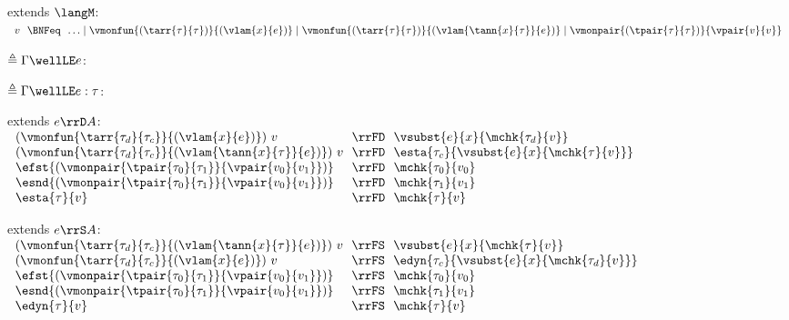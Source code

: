 \begin{flushleft}

 extends $\langM$:\\
$\begin{array}{l@{~~}c@{~~}l}
  v & \BNFeq & \ldots \mid \vmonfun{(\tarr{\tau}{\tau})}{(\vlam{x}{e})} \mid
      \vmonfun{(\tarr{\tau}{\tau})}{(\vlam{\tann{x}{\tau}}{e})} \mid
      \vmonpair{(\tpair{\tau}{\tau})}{\vpair{v}{v}}
\end{array}$

\bigskip
\begin{minipage}[t]{\columnwidth}
 $\triangleq \Gamma \wellLE e$:
\end{minipage}\hspace{\columnsep}%
\begin{minipage}[t]{\columnwidth}
 $\triangleq \Gamma \wellLE e : \tau$:
\end{minipage}


\medskip
\begin{minipage}[t]{\columnwidth}
 extends $e \rrD A$:\\
$\begin{array}{l@{~~}c@{~~}l}
  (\vmonfun{\tarr{\tau_d}{\tau_c}}{(\vlam{x}{e})})~v & \rrFD & \vsubst{e}{x}{\mchk{\tau_d}{v}}
\\
  (\vmonfun{\tarr{\tau_d}{\tau_c}}{(\vlam{\tann{x}{\tau}}{e})})~v & \rrFD & \esta{\tau_c}{\vsubst{e}{x}{\mchk{\tau}{v}}}
\\
  \efst{(\vmonpair{\tpair{\tau_0}{\tau_1}}{\vpair{v_0}{v_1}})} & \rrFD & \mchk{\tau_0}{v_0}
\\
  \esnd{(\vmonpair{\tpair{\tau_0}{\tau_1}}{\vpair{v_0}{v_1}})} & \rrFD & \mchk{\tau_1}{v_1}
\\
  \esta{\tau}{v} & \rrFD & \mchk{\tau}{v}
\end{array}$
\end{minipage}\hspace{\columnsep}%
\begin{minipage}[t]{\columnwidth}
 extends $e \rrS A$:\\
$\begin{array}{l@{~~}c@{~~}l}
  (\vmonfun{\tarr{\tau_d}{\tau_c}}{(\vlam{\tann{x}{\tau}}{e})})~v & \rrFS & \vsubst{e}{x}{\mchk{\tau}{v}}
\\
  (\vmonfun{\tarr{\tau_d}{\tau_c}}{(\vlam{x}{e})})~v & \rrFS & \edyn{\tau_c}{\vsubst{e}{x}{\mchk{\tau_d}{v}}}
\\
  \efst{(\vmonpair{\tpair{\tau_0}{\tau_1}}{\vpair{v_0}{v_1}})} & \rrFS & \mchk{\tau_0}{v_0}
\\
  \esnd{(\vmonpair{\tpair{\tau_0}{\tau_1}}{\vpair{v_0}{v_1}})} & \rrFS & \mchk{\tau_1}{v_1}
\\
  \edyn{\tau}{v} & \rrFS & \mchk{\tau}{v}
\end{array}$
\end{minipage}


\end{flushleft}
